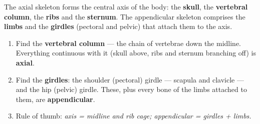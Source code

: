\documentclass[11pt]{article}
\newcommand{\cle}[1]{{\popxbold\color{popdark}#1}}
\begin{document}
\begin{definition}
The \cle{axial skeleton} forms the central axis of the body: the \textbf{skull}, the \textbf{vertebral column}, the \textbf{ribs} and the \textbf{sternum}. The \cle{appendicular skeleton} comprises the \textbf{limbs} and the \textbf{girdles} (pectoral and pelvic) that attach them to the axis.
\end{definition}

\begin{methode}
\begin{enumerate}
\item Find the \textbf{vertebral column} --- the chain of vertebrae down the midline. Everything continuous with it (skull above, ribs and sternum branching off) is \textbf{axial}.
\item Find the \textbf{girdles}: the shoulder (pectoral) girdle --- scapula and clavicle --- and the hip (pelvic) girdle. These, plus every bone of the limbs attached to them, are \textbf{appendicular}.
\item Rule of thumb: \emph{axis = midline and rib cage; appendicular = girdles + limbs.}
\end{enumerate}
\end{methode}
\end{document}
